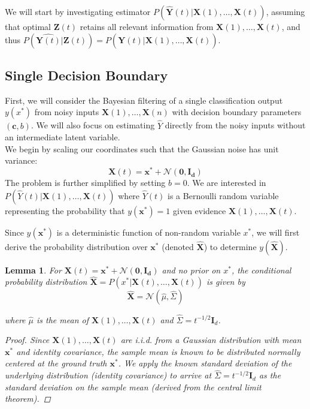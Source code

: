 \documentclass[12pt]{article}
\newtheorem{lemma}{Lemma}
\begin{document}
We will start by investigating estimator $P(\hat{\mathbf Y}(t) | \mathbf X(1), \dots, \mathbf X(t))$, assuming that optimal $\mathbf Z(t)$ retains all relevant information from $\mathbf X(1), \dots, \mathbf X(t)$, and thus $P(\hat{\mathbf Y(t)} | \mathbf Z(t)) = P(\hat{\mathbf Y(t)} | \mathbf X(1), \dots, \mathbf X(t))$. 


\subsection{Single Decision Boundary}
\label{sec:single_boundary}

First, we will consider the Bayesian filtering of a single classification output $y(x^*)$ from noisy inputs $\mathbf X(1), \dots, \mathbf X(n)$ with decision boundary parameters $(\mathbf c, b)$. 
We will also focus on estimating $\hat Y$ directly from the noisy inputs without an intermediate latent variable.  \\

We begin by scaling our coordinates such that the Gaussian noise has unit variance:
\begin{equation}
	\mathbf X(t) = \mathbf x^* + \mathcal N(\mathbf{0, I_d})
\end{equation}
The problem is further simplified by setting $b = 0$. 
We are interested in $P(\hat Y(t) | \mathbf X(1), \dots, \mathbf X(t))$ where $\hat Y(t)$ is a Bernoulli random variable representing the probability that $y(\mathbf x^*) = 1$ given evidence $\mathbf X(1), \dots, \mathbf X(t)$. 

Since $y(\mathbf x^*)$ is a deterministic function of non-random variable $x^*$, we will first derive the probability distribution over $\mathbf x^*$ (denoted $\hat{\mathbf X}$) to determine $y(\hat{\mathbf X})$. 

\begin{lemma}
	\label{lemma:x_star_estimate}
	For $\mathbf X(t) = \mathbf x^* + \mathcal N(\mathbf{0, I_d})$ and no prior on $x^*$, the conditional probability distribution $\hat{\mathbf X} = P(x^* | \mathbf X(t), \dots, \mathbf X(t))$ is given by 
	\begin{equation}
		\hat{\mathbf X} = \mathcal N(\hat \mu, \hat \Sigma)
	\end{equation}

	where $\hat \mu$ is the mean of $\mathbf X(1), \dots, \mathbf X(t)$ and $\hat \Sigma = t^{-1/2} \mathbf I_d$. 

	\begin{proof}
		Since $\mathbf X(1), \dots, \mathbf X(t)$ are i.i.d. from a Gaussian distribution with mean $\mathbf x^*$ and identity covariance, the sample mean is known to be distributed normally centered at the ground truth $\mathbf x^*$. 
		We apply the known standard deviation of the underlying distribution (identity covariance) to arrive at $\hat \Sigma = t^{-1/2} \mathbf I_d$ as the standard deviation on the sample mean (derived from the central limit theorem). 
	\end{proof}
\end{lemma}
\end{document}
